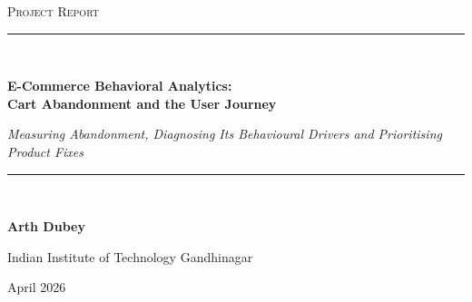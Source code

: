 \documentclass[11pt, a4paper]{article}
\begin{document}
\thispagestyle{plain}
\begin{center}
{\small\scshape\color{brick} Project Report }\\[8pt]
{\color{black}\rule{\linewidth}{1.2pt}}\\[14pt]
{\LARGE\bfseries\color{black} E-Commerce Behavioral Analytics:\\[4pt] Cart Abandonment and the User Journey\par}
\vspace{10pt}
{\large\itshape\color{black!75} Measuring Abandonment, Diagnosing Its Behavioural Drivers and Prioritising Product Fixes\par}
\vspace{12pt}
{\color{black}\rule{\linewidth}{0.4pt}}\\[14pt]
{\large\bfseries Arth Dubey\par}
\vspace{3pt}
{\normalsize Indian Institute of Technology Gandhinagar\par}
\vspace{3pt}
{\normalsize\color{black!70} April 2026\par}
\end{center}

\vspace{14pt}
\end{document}
